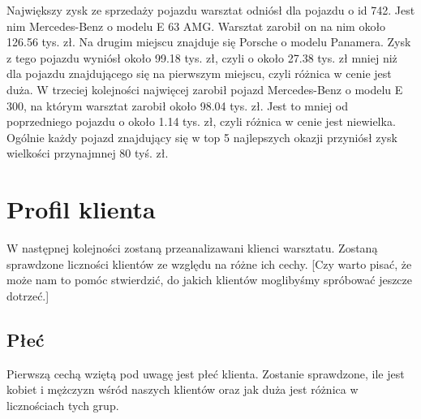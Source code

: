 \documentclass{article}\usepackage[]{graphicx}\usepackage[]{xcolor}
\begin{document}
Największy zysk ze sprzedaży pojazdu warsztat odniósł dla pojazdu o id 742. Jest nim Mercedes-Benz o modelu E 63 AMG. Warsztat zarobił on na nim około 126.56 tys. zł. 
Na drugim miejscu znajduje się Porsche o modelu Panamera. Zysk z tego pojazdu wyniósł około 99.18 tys. zł, czyli o około 27.38 tys. zł mniej niż dla pojazdu znajdującego się na pierwszym miejscu, czyli różnica w cenie jest duża.
W trzeciej kolejności najwięcej zarobił pojazd Mercedes-Benz o modelu E 300, na którym warsztat zarobił około 98.04 tys. zł. Jest to mniej od poprzedniego pojazdu o około 1.14 tys. zł, czyli różnica w cenie jest niewielka. 
Ogólnie każdy pojazd znajdujący się w top 5 najlepszych okazji przyniósł zysk wielkości przynajmnej 80 tyś. zł.

\section{Profil klienta}

W następnej kolejności zostaną przeanalizawani klienci warsztatu. Zostaną sprawdzone liczności klientów ze względu na różne ich cechy. {\color{red}[Czy warto pisać, że może nam to pomóc stwierdzić, do jakich klientów moglibyśmy spróbować jeszcze dotrzeć.]}

\subsection{Płeć}

Pierwszą cechą wziętą pod uwagę jest płeć klienta. Zostanie sprawdzone, ile jest kobiet i mężczyzn wśród naszych klientów oraz jak duża jest różnica w licznościach tych grup.
\end{document}
